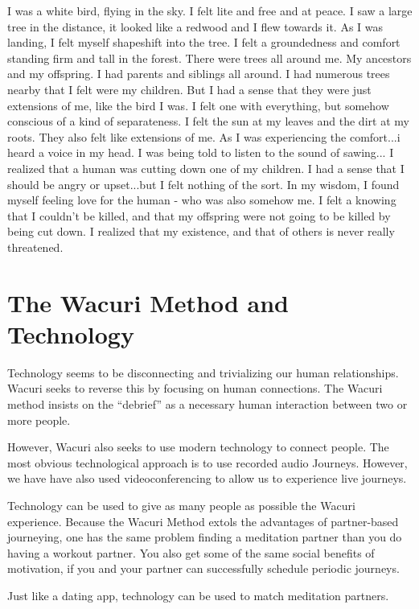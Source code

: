 \documentclass[12pt]{book}
\begin{document}
I was a white bird, flying in the sky. I felt lite and free and at
peace. I saw a large tree in the distance, it looked like a redwood
and I flew towards it. As I was landing, I felt myself shapeshift into
the tree. I felt a groundedness and comfort standing firm and tall in
the forest. There were trees all around me. My ancestors and my
offspring. I had parents and siblings all around. I had numerous trees
nearby that I felt were my children. But I had a sense that they were
just extensions of me, like the bird I was. I felt one with
everything, but somehow conscious of a kind of separateness. I felt
the sun at my leaves and the dirt at my roots. They also felt like
extensions of me. As I was experiencing the comfort...i heard a voice
in my head. I was being told to listen to the sound of sawing... I
realized that a human was cutting down one of my children. I had a
sense that I should be angry or upset...but I felt nothing of the
sort. In my wisdom, I found myself feeling love for the human - who
was also somehow me. I felt a knowing that I couldn't be killed, and
that my offspring were not going to be killed by being cut down. I
realized that my existence, and that of others is never really
threatened.

\chapter{The Wacuri Method and Technology}

Technology seems to be disconnecting and trivializing our human relationships.
Wacuri seeks to reverse this by focusing on human connections. The Wacuri method
insists on the ``debrief'' as a necessary human interaction between two or more people.

However, Wacuri also seeks to use modern technology to connect people.
The most obvious technological approach is to use recorded audio Journeys.
However, we have have also used videoconferencing to allow us to experience live journeys.

Technology can be used to give as many people as possible the Wacuri experience.
Because the Wacuri Method extols the advantages of partner-based journeying,
one has the same problem finding a meditation partner than you do having a
workout partner. You also get some of the same social benefits of motivation,
if you and your partner can successfully schedule periodic journeys.

Just like a dating app, technology can be used to match meditation partners.
\end{document}
